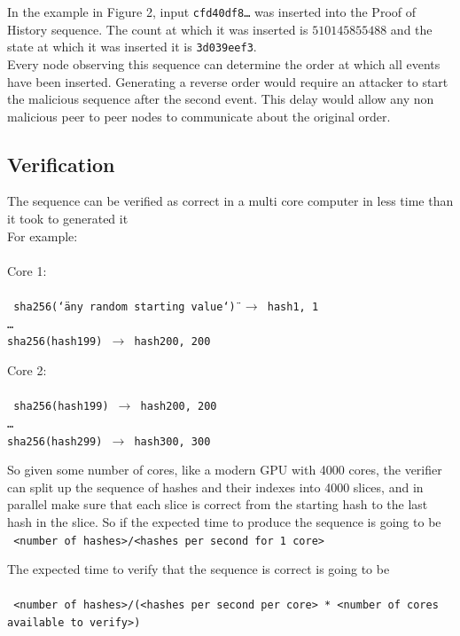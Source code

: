\documentclass[12pt]{article}
\begin{document}
  In the example in Figure 2, input \texttt{cfd40df8\ldots} was inserted into the Proof of History sequence. The count at which it was inserted is $510145855488$ and the state at which it was inserted it is \texttt{3d039eef3}.\\

Every node observing this sequence can determine the order at which all events have been inserted. Generating a reverse order would require an attacker to start the malicious sequence after the second event. This delay would allow any non malicious peer to peer nodes to communicate about the original order.\\

\subsection{Verification}
The sequence can be verified as correct in a multi core computer in less time than it took to generated it \\

\noindent For example: \\\\\noindent
\noindent Core 1: \\\\\noindent
\texttt{
sha256(\char`\"any random starting value\char`\") $\rightarrow$ hash1, 1\\
\ldots\\
sha256(hash199) $\rightarrow$ hash200, 200\\
}

\noindent Core 2: \\\\\noindent
\texttt{
sha256(hash199) $\rightarrow$ hash200, 200\\
\ldots\\
sha256(hash299) $\rightarrow$ hash300, 300\\
}

So given some number of cores, like a modern GPU with 4000 cores, the verifier can split up the sequence of hashes and their indexes into 4000 slices, and in parallel make sure that each slice is correct from the starting hash to the last hash in the slice.  So if the expected time to produce the sequence is going to be\\
\texttt{
<number of hashes>/<hashes per second for 1 core>
}

\noindent The expected time to verify that the sequence is correct is going to be \\\\\noindent
\texttt{
<number of hashes>/(<hashes per second per core> * <number of cores available to verify>)
}
\end{document}
